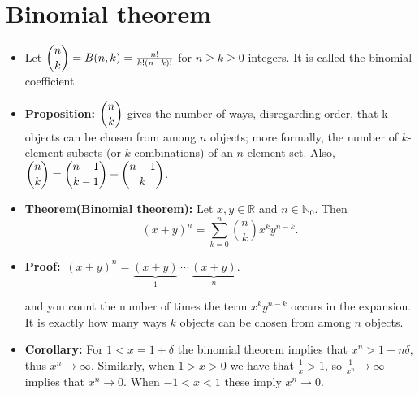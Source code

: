 \documentclass{article}
\begin{document}
\section{Binomial theorem}
\begin{itemize}
    \item Let $\dbinom{n}{k} = B(n,k) = \frac{n!}{k!(n-k)!}$ for $n \geq k \geq 0$ integers. It is called the binomial coefficient.
    \item \textbf{Proposition:} $\dbinom{n}{k}$ gives the number of ways, disregarding order, that k objects can be chosen from among $n$ objects; more formally, the number of $k$-element subsets (or $k$-combinations) of an $n$-element set. Also, $\dbinom{n}{k} = \dbinom{n-1}{k-1} + \dbinom{n-1}{k}$.
    \item \textbf{Theorem(Binomial theorem):} Let $x, y \in \mathbb{R}$ and $n \in \mathbb{N}_0$. Then 
    \[
    (x+y)^n = \sum_{k=0}^{n} \binom{n}{k} x^k y^{n-k}.
    \]
    \item \textbf{Proof:}~$(x+y)^n = \underbrace{(x+y)}_{1}\,\cdots\,\underbrace{(x+y)}_{n}.$

    and you count the number of times the term $x^k y^{n-k}$ occurs in the expansion. It is exactly how many ways $k$ objects can be chosen from among $n$ objects.
    \item \textbf{Corollary:} For $1 < x = 1 + \delta$ the binomial theorem implies that $x^n > 1 + n\delta$, thus $x^n \to \infty$. Similarly, when $1 > x > 0$ we have that $\frac{1}{x} > 1$, so $\frac{1}{x^n} \to \infty$ implies that $x^n \to 0$. When $-1 < x < 1$ these imply $x^n \to 0$.
\end{itemize}
\end{document}
